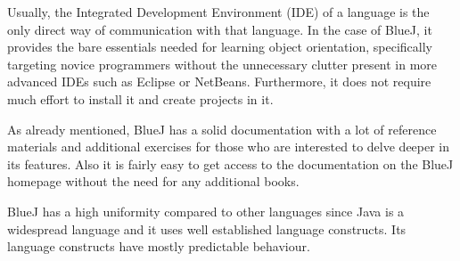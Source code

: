 \begin{description}[style=nextline]
\item[Environment]
Usually, the Integrated Development Environment (IDE) of a language is the only direct way of communication with that language. In the case of BlueJ, it provides the bare essentials needed for learning object orientation, specifically targeting novice programmers without the unnecessary clutter present in more advanced IDEs such as Eclipse or NetBeans. Furthermore, it does not require much effort to install it and create projects in it.
\item[Documentation]
As already mentioned, BlueJ has a solid documentation with a lot of reference materials and additional exercises for those who are interested to delve deeper in its features. Also it is fairly easy to get access to the documentation on the BlueJ homepage without the need for any additional books.
\item[Uniformity]
BlueJ has a high uniformity compared to other languages since Java is a widespread language and it uses well established language constructs. Its language constructs have mostly predictable behaviour.
\end{description}